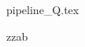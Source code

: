 \documentclass{exam}
\begin{document}


\begin{questions}

                               \printanswers


    {pipeline_Q.tex}


    \question  zzab




\end{questions}
\end{document}
